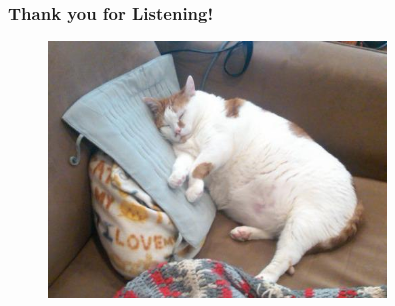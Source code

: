 \documentclass[hyperref={pdfpagelabels=true}]{beamer}
\begin{document}

\begin{frame}
\frametitle{Thank you for Listening!}
    \begin{figure}  
      \includegraphics[width=0.8\textwidth]{fat-cat.jpg}    
     \end{figure}  
\end{frame}
\end{document}
